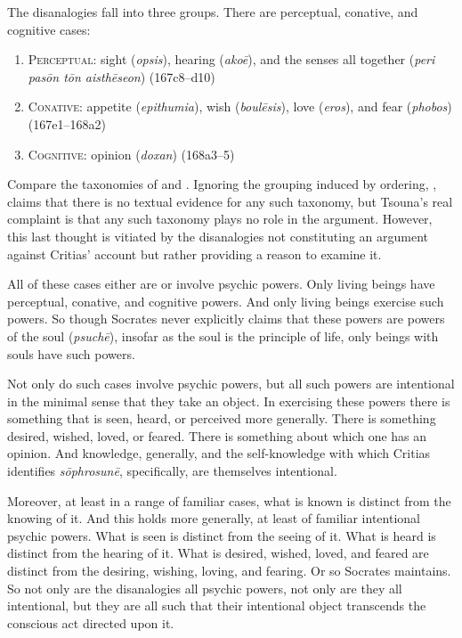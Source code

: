 The disanalogies fall into three groups. There are perceptual, conative, and cognitive cases:
\begin{enumerate}[(1)]
	\item \textsc{Perceptual}: sight (\emph{opsis}), hearing (\emph{akoē}), and the senses all together (\emph{peri pasōn tōn aisthēseon}) (167c8–d10)
	\item \textsc{Conative}: appetite (\emph{epithumia}), wish (\emph{boulēsis}), love (\emph{eros}), and fear (\emph{phobos}) (167e1–168a2)
	\item \textsc{Cognitive}: opinion (\emph{doxan}) (168a3–5)
\end{enumerate}
Compare the taxonomies of \citet[114–8]{Hyland:1981aa} and \citet[90]{Schmid:1998aa}. Ignoring the grouping induced by ordering, \citet[207 n37]{Tsouna:2022aa}, claims that there is no textual evidence for any such taxonomy, but Tsouna's real complaint is that any such taxonomy plays no role in the argument. However, this last thought is vitiated by the disanalogies not constituting an argument against Critias' account but rather providing a reason to examine it.

All of these cases either are or involve psychic powers. Only living beings have perceptual, conative, and cognitive powers. And only living beings exercise such powers. So though Socrates never explicitly claims that these powers are powers of the soul (\emph{psuchē}), insofar as the soul is the principle of life, only beings with souls have such powers. 

Not only do such cases involve psychic powers, but all such powers are intentional in the minimal sense that they take an object. In exercising these powers there is something that is seen, heard, or perceived more generally. There is something desired, wished, loved, or feared. There is something about which one has an opinion. And knowledge, generally, and the self-knowledge with which Critias identifies \emph{sōphrosunē}, specifically, are themselves intentional. 

Moreover, at least in a range of familiar cases, what is known is distinct from the knowing of it. And this holds more generally, at least of familiar intentional psychic powers. What is seen is distinct from the seeing of it. What is heard is distinct from the hearing of it. What is desired, wished, loved, and feared are distinct from the desiring, wishing, loving, and fearing. Or so Socrates maintains. So not only are the disanalogies all psychic powers, not only are they all intentional, but they are all such that their intentional object transcends the conscious act directed upon it.

